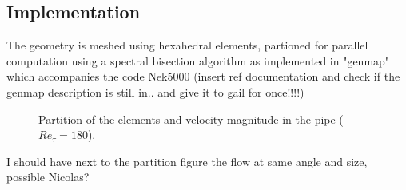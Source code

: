 \documentclass{sig-alternate}
\begin{document}

\subsection{Implementation}
\label{sec:implementation}
The geometry is meshed using hexahedral elements, partioned for parallel computation using a spectral bisection algorithm as implemented in "genmap" which accompanies the code Nek5000 (insert ref documentation and check if the genmap description is still in.. and give it to gail for once!!!!)
\begin{figure}
  \centering
  \caption{Partition of the elements and velocity magnitude in the pipe ($Re_{\tau}=180$).}
  \label{fig:partition}
\end{figure}
 
I should have next to the partition figure the flow at same angle and size, possible Nicolas? 
\end{document}
